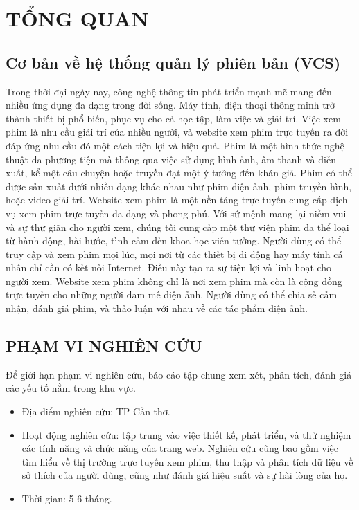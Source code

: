 \chapter{TỔNG QUAN}
\section{Cơ bản về hệ thống quản lý phiên bản (VCS)}
\hspace{1cm}Trong thời đại ngày nay, công nghệ thông tin phát triển mạnh mẽ mang đến nhiều ứng dụng đa dạng trong đời sống. Máy tính, điện thoại thông minh trở thành thiết bị phổ biến, phục vụ cho cả học tập, làm việc và giải trí. Việc xem phim là nhu cầu giải trí của nhiều người, và website xem phim trực tuyến ra đời đáp ứng nhu cầu đó một cách tiện lợi và hiệu quả.
Phim là một hình thức nghệ thuật đa phương tiện mà thông qua việc sử dụng hình ảnh, âm thanh và diễn xuất, kể một câu chuyện hoặc truyền đạt một ý tưởng đến khán giả. Phim có thể được sản xuất dưới nhiều dạng khác nhau như phim điện ảnh, phim truyền hình, hoặc video giải trí.
Website xem phim là một nền tảng trực tuyến cung cấp dịch vụ xem phim trực tuyến đa dạng và phong phú. Với sứ mệnh mang lại niềm vui và sự thư giãn cho người xem, chúng tôi cung cấp một thư viện phim đa thể loại từ hành động, hài hước, tình cảm đến khoa học viễn tưởng. Người dùng có thể truy cập và xem phim mọi lúc, mọi nơi từ các thiết bị di động hay máy tính cá nhân chỉ cần có kết nối Internet. Điều này tạo ra sự tiện lợi và linh hoạt cho người xem. Website xem phim không chỉ là nơi xem phim mà còn là cộng đồng trực tuyến cho những người đam mê điện ảnh. Người dùng có thể chia sẻ cảm nhận, đánh giá phim, và thảo luận với nhau về các tác phẩm điện ảnh.

\section{PHẠM VI NGHIÊN CỨU}
\hspace{1cm}Để giới hạn phạm vi nghiên cứu, báo cáo tập chung xem xét, phân tích, đánh giá các yếu tố nằm trong khu vực.

\begin{itemize}
    \item Địa điểm nghiên cứu: TP Cần thơ.
    \item Hoạt động nghiên cứu: tập trung vào việc thiết kế, phát triển, và thử nghiệm các tính năng và chức năng của trang web. Nghiên cứu cũng bao gồm việc tìm hiểu về thị trường trực tuyến xem phim, thu thập và phân tích dữ liệu về sở thích của người dùng, cũng như đánh giá hiệu suất và sự hài lòng của họ.
    \item Thời gian: 5-6 tháng.
\end{itemize}

